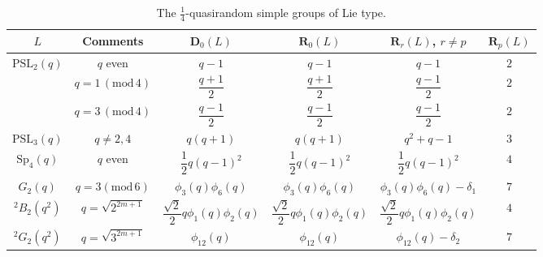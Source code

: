 \documentclass{daj}
\theoremstyle{definition}
\theoremstyle{remark}
\newcommand{\PSL}{\mathrm{PSL}}
\newcommand{\D}{\mathbf{D}}
\newcommand{\Di}{\mathbf{R}}
\begin{document}
{\small 
\begin{table}[ht] 
	\centering
	\begin{tabular}{| c c | c c c c |} 
		\hline
		
		\phantom{$\dfrac{1^1}{1_{1_1}}$}\hspace{-6mm}
		$L$ & Comments  & $\D_0(L)$ & $\Di_0(L)$ & $\Di_r(L)$, $r\ne p$ & $\Di_p(L)$ \\
		
		\hline \hline
		
		\phantom{$\dfrac{1^1}{1_{1_1}}$}\hspace{-6mm}
		$\PSL_2(q)$ & $q$ even & $q-1$ & $q-1$ & $q-1$ & $2$ \\
		
		\phantom{$\dfrac{1^1}{1_{1_1}}$}\hspace{-6mm}
		& $q = 1\, (\mathrm{mod}\,4) $ & $\dfrac{q+1}{2}$ & $\dfrac{q+1}{2}$ & $\dfrac{q-1}{2}$ & $2$ \\
		
		\phantom{$\dfrac{1^1}{1_{1_1}}$}\hspace{-6mm}
		& $q = 3\, (\mathrm{mod}\,4) $ & $\dfrac{q-1}{2}$ & $\dfrac{q-1}{2}$ & $\dfrac{q-1}{2}$ & $2$ \\
		
		\phantom{$\dfrac{1^1}{1_{1_1}}$}\hspace{-6mm}
		$\PSL_3(q)$ & $q \ne 2,4$ & $q(q+1)$ & $q(q+1)$ & $q^2+q-1$ & $3$ \\
		
		\phantom{$\dfrac{1^1}{1_{1_1}}$}\hspace{-6mm}
		$\mathrm{Sp}_4(q)$ & $q$ even & $\dfrac{1}{2}q(q-1)^2$ & $\dfrac{1}{2}q(q-1)^2$ & $\dfrac{1}{2}q(q-1)^2$ & $4$ \\
		
		\phantom{$\dfrac{1^1}{1_{1_1}}$}\hspace{-6mm}
		$G_2(q)$ & $q=3 (\mathrm{mod}\,6)$ & $\phi_3(q)\phi_6(q)$ & $\phi_3(q)\phi_6(q)$ & $\phi_3(q)\phi_6(q) - \delta_1$ & $7$ \\
		
		\phantom{$\dfrac{1^1}{1_{1_1}}$}\hspace{-6mm}
		$^2B_2(q^2)$ & $q=\sqrt{2^{2m+1}}$ & $\dfrac{\sqrt{2}}{2} q \phi_1(q) \phi_2(q)$ & $\dfrac{\sqrt{2}}{2} q \phi_1(q) \phi_2(q)$ & $\dfrac{\sqrt{2}}{2} q \phi_1(q) \phi_2(q)$ & $4$ \\
		
		\phantom{$\dfrac{1^1}{1_{1_1}}$}\hspace{-6mm}
		$^2G_2(q^2)$ & $q=\sqrt{3^{2m+1}}$ & $\phi_{12}(q)$ & $\phi_{12}(q)$ & $\phi_{12}(q)-\delta_2$ & $7$ \\
		
		\hline
		
	\end{tabular}
	\medskip
	{\caption{The $\frac{1}{4}$-quasirandom simple groups of Lie type.} \label{table:1/4}}
\end{table}
} 
	
\end{document}
